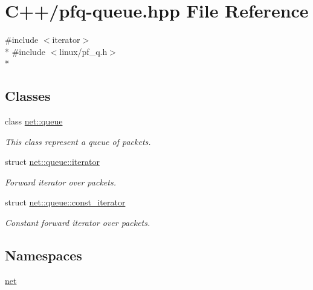 \hypertarget{pfq-queue_8hpp}{\section{C++/pfq-\/queue.hpp File Reference}
\label{pfq-queue_8hpp}
}
{\ttfamily \#include $<$iterator$>$}\\*
{\ttfamily \#include $<$linux/pf\-\_\-q.\-h$>$}\\*
\subsection*{Classes}
\begin{DoxyCompactItemize}
\item 
class \hyperlink{classnet_1_1queue}{net\-::queue}
\begin{DoxyCompactList}\small\item\em This class represent a queue of packets. \end{DoxyCompactList}\item 
struct \hyperlink{structnet_1_1queue_1_1iterator}{net\-::queue\-::iterator}
\begin{DoxyCompactList}\small\item\em Forward iterator over packets. \end{DoxyCompactList}\item 
struct \hyperlink{structnet_1_1queue_1_1const__iterator}{net\-::queue\-::const\-\_\-iterator}
\begin{DoxyCompactList}\small\item\em Constant forward iterator over packets. \end{DoxyCompactList}\end{DoxyCompactItemize}
\subsection*{Namespaces}
\begin{DoxyCompactItemize}
\item 
\hyperlink{namespacenet}{net}
\end{DoxyCompactItemize}
